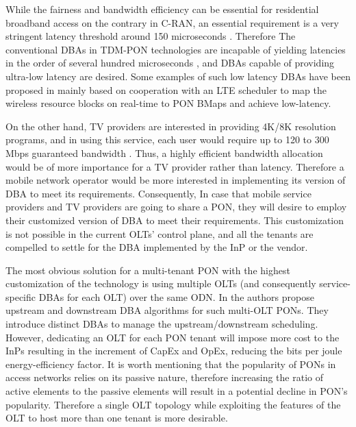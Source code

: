 While the fairness and bandwidth efficiency can be essential for residential broadband access on the contrary in \ac{C-RAN}, an essential requirement is a very stringent latency threshold around 150 microseconds \cite{7456186}. Therefore The conventional \acp{DBA} in TDM-PON technologies are incapable of yielding latencies in the order of several hundred microseconds \cite{6950589}, and \acp{DBA} capable of providing ultra-low latency are desired. Some examples of such low latency \acp{DBA} have been proposed in \cite{6886953,7511482,Zhou:17} mainly based on cooperation with an LTE scheduler to map the wireless resource blocks on real-time to \ac{PON} \acp{BMap} and achieve low-latency.


On the other hand, TV providers are interested in providing 4K/8K resolution programs, and in using this service, each user would require up to 120 to 300 Mbps guaranteed bandwidth \cite{7121687}. Thus, a highly efficient bandwidth allocation would be of more importance for a TV provider rather than latency. Therefore a mobile network operator would be more interested in implementing its version of \ac{DBA} to meet its requirements. Consequently, In case that mobile service providers and TV providers are going to share a \ac{PON}, they will desire to employ their customized version of \ac{DBA} to meet their requirements. This customization is not possible in the current \acp{OLT}' control plane, and all the tenants are compelled to settle for the \ac{DBA} implemented by the \ac{InP} or the vendor.

The most obvious solution for a multi-tenant \ac{PON} with the highest customization of the technology is using multiple \acp{OLT} (and consequently service-specific \acp{DBA} for each \ac{OLT}) over the same \ac{ODN}. In \cite{6261710} the authors propose upstream and downstream \ac{DBA} algorithms for such multi-\ac{OLT} \acp{PON}. They introduce distinct \acp{DBA} to manage the upstream/downstream scheduling. However, dedicating an \ac{OLT} for each \ac{PON} tenant will impose more cost to the \acp{InP} resulting in the increment of \ac{CapEx} and \ac{OpEx}, reducing the bits per joule energy-efficiency factor. It is worth mentioning that the popularity of \acp{PON} in access networks relies on its passive nature, therefore increasing the ratio of active elements to the passive elements will result in a potential decline in \ac{PON}'s popularity. Therefore a single \ac{OLT} topology while exploiting the features of the \ac{OLT} to host more than one tenant is more desirable.


